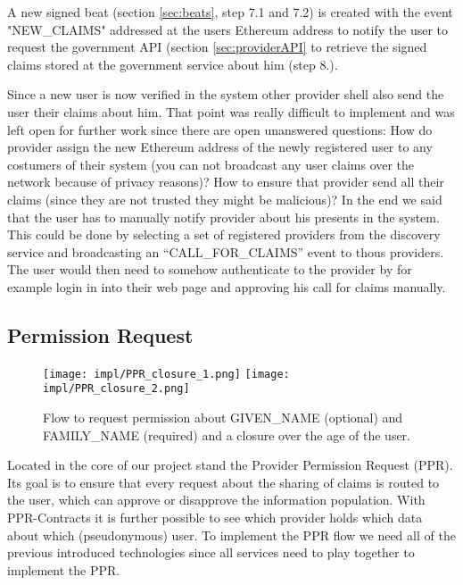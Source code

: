 A new signed beat (section \ref{sec:beats}, step 7.1 and 7.2) is created with the event "NEW\_CLAIMS" addressed at the users Ethereum address to notify the user to request the government API (section \ref{sec:providerAPI} to retrieve the signed claims stored at the government service about him (step 8.).

Since a new user is now verified in the system other provider shell also send the user their claims about him. That point was really difficult to implement and was left open for further work since there are open unanswered questions: How do provider assign the new Ethereum address of the newly registered user to any costumers of their system (you can not broadcast any user claims over the network because of privacy reasons)? How to ensure that provider send all their claims (since they are not trusted they might be malicious)?
In the end we said that the user has to manually notify provider about his presents in the system. This could be done by selecting a set of registered providers from the discovery service and broadcasting an “CALL\_FOR\_CLAIMS” event to thous providers. The user would then need to somehow authenticate to the provider by for example login in into their web page and approving his call for claims manually. 

\subsection{Permission Request}
\label{sec:ppr}

\begin{figure}
\texttt{[image: impl/PPR\_closure\_1.png]}
\texttt{[image: impl/PPR\_closure\_2.png]}
\centering
\caption{Flow to request permission about GIVEN\_NAME (optional) and FAMILY\_NAME (required) and a closure over the age of the user.}
\label{fig:ppr}
\end{figure}

Located in the core of our project stand the Provider Permission Request (PPR). Its goal is to ensure that every request about the sharing of claims is routed to the user, which can approve or disapprove the information population. With PPR-Contracts it is further possible to see which provider holds which data about which (pseudonymous) user. To implement the PPR flow we need all of the previous introduced technologies since all services need to play together to implement the PPR. 

